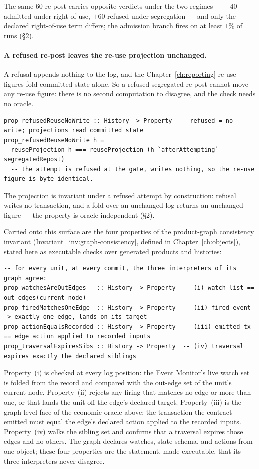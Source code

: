 \documentclass[11pt,a4paper]{article}
\begin{document}
The same $60$ re-post carries opposite verdicts under the two regimes --- $-40$ admitted
under right of use, $+60$ refused under segregation --- and only the declared right-of-use
term differs; the admission branch fires on at least $1\%$ of runs (\S 2).

\paragraph{A refused re-post leaves the re-use projection unchanged.}
A refusal appends nothing to the log, and the Chapter~\ref{ch:reporting} re-use figures
fold committed state alone. So a refused segregated re-post cannot move any re-use figure:
there is no second computation to disagree, and the check needs no oracle.

\begin{lstlisting}
prop_refusedReuseNoWrite :: History -> Property  -- refused = no write; projections read committed state
prop_refusedReuseNoWrite h =
  reuseProjection h === reuseProjection (h `afterAttempting` segregatedRepost)
  -- the attempt is refused at the gate, writes nothing, so the re-use figure is byte-identical.
\end{lstlisting}

The projection is invariant under a refused attempt by construction: refusal writes no
transaction, and a fold over an unchanged log returns an unchanged figure --- the property
is oracle-independent (\S 2).

Carried onto this surface are the four properties of the product-graph consistency invariant
(Invariant~\ref{inv:graph-consistency}, defined in Chapter~\ref{ch:objects}), stated here as
executable checks over generated products and histories:

\begin{lstlisting}
-- for every unit, at every commit, the three interpreters of its graph agree:
prop_watchesAreOutEdges   :: History -> Property  -- (i) watch list == out-edges(current node)
prop_firedMatchesOneEdge  :: History -> Property  -- (ii) fired event -> exactly one edge, lands on its target
prop_actionEqualsRecorded :: History -> Property  -- (iii) emitted tx == edge action applied to recorded inputs
prop_traversalExpiresSibs :: History -> Property  -- (iv) traversal expires exactly the declared siblings
\end{lstlisting}

Property~(i) is checked at every log position: the Event Monitor's live watch set is folded
from the record and compared with the out-edge set of the unit's current node. Property~(ii)
rejects any firing that matches no edge or more than one, or that lands the unit off the
edge's declared target. Property~(iii) is the graph-level face of the economic oracle above:
the transaction the contract emitted must equal the edge's declared action applied to the
recorded inputs. Property~(iv) walks the sibling set and confirms that a traversal expires
those edges and no others. The graph declares watches, state schema, and actions from one
object; these four properties are the statement, made executable, that its three interpreters
never disagree.
\end{document}
